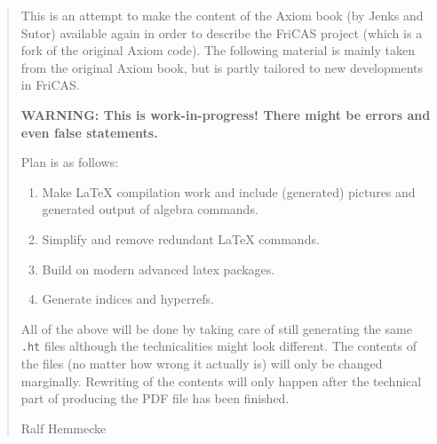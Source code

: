 \documentclass[twoside,a4paper]{book}
\begin{document}
%
%
\setcounter{page}{0}

\begin{quote}
\color{red}\Large
  This is an attempt to make the content of the Axiom book (by Jenks
  and Sutor) available again in order to describe the FriCAS project
  (which is a fork of the original Axiom code). The following
  material is mainly taken from the original Axiom book, but is partly
  tailored to new developments in FriCAS.

  \vspace{1cm}

  \textbf{WARNING: This is work-in-progress! There might be errors and
    even false statements.}

  Plan is as follows:
  \begin{enumerate}
  \item Make LaTeX compilation work and include (generated) pictures
    and generated output of algebra commands.
  \item Simplify and remove redundant \LaTeX{} commands.
  \item Build on modern advanced latex packages.
  \item Generate indices and hyperrefs.
  \end{enumerate}

  All of the above will be done by taking care of still generating the
  same \texttt{.ht} files although the technicalities might look
  different. The contents of the files (no matter how wrong it
  actually is) will only be changed marginally. Rewriting of the
  contents will only happen after the technical part of producing the
  PDF file has been finished.

  \hspace*{\fill}Ralf Hemmecke
\end{quote}
\end{document}
